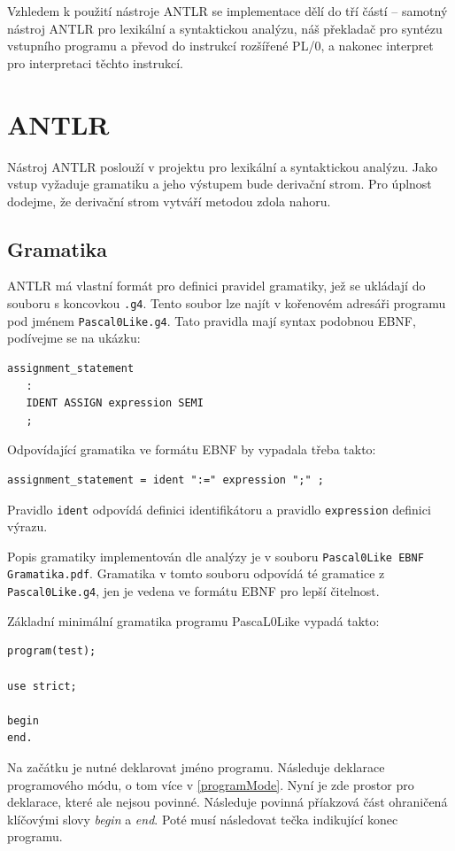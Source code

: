 \documentclass[
12pt,
a4paper,
pdftex,
czech,
titlepage
]{report}
\begin{document}
 Vzhledem k použití nástroje ANTLR se implementace dělí do tří částí -- samotný nástroj ANTLR pro lexikální a syntaktickou analýzu, náš překladač pro syntézu vstupního programu a převod do instrukcí rozšířené PL/0, a nakonec interpret pro interpretaci těchto instrukcí.
 
 \section{ANTLR}
 
 Nástroj ANTLR poslouží v projektu pro lexikální a syntaktickou analýzu. Jako vstup vyžaduje gramatiku a jeho výstupem bude derivační strom. Pro úplnost dodejme, že derivační strom vytváří metodou zdola nahoru.

 
 \subsection{Gramatika} \label{gramatika}
	ANTLR má vlastní formát pro definici pravidel gramatiky, jež se ukládají do souboru s koncovkou \texttt{.g4}. Tento soubor lze najít v kořenovém adresáři programu pod jménem \texttt{Pascal0Like.g4}. Tato pravidla mají syntax podobnou EBNF, podívejme se na ukázku:
\begin{lstlisting}
assignment_statement
   :
   IDENT ASSIGN expression SEMI
   ;
\end{lstlisting}	
Odpovídající gramatika ve formátu EBNF by vypadala třeba takto:
\begin{lstlisting}
assignment_statement = ident ":=" expression ";" ;
\end{lstlisting}	

Pravidlo \texttt{ident} odpovídá definici identifikátoru a pravidlo \texttt{expression} definici výrazu.

Popis gramatiky implementován dle analýzy je v souboru \texttt{Pascal0Like EBNF Gramatika.pdf}. Gramatika v tomto souboru odpovídá té gramatice z \texttt{Pascal0Like.g4}, jen je vedena ve formátu EBNF pro lepší čitelnost.

Základní minimální gramatika programu PascaL0Like vypadá takto:
\begin{lstlisting}
program(test);

use strict;

begin
end.
\end{lstlisting}

Na začátku je nutné deklarovat jméno programu. Následuje deklarace programového módu, o tom více v \ref{programMode}. Nyní je zde prostor pro deklarace, které ale nejsou povinné. Následuje povinná příakzová část ohraničená klíčovými slovy \textit{begin} a \textit{end}. Poté musí následovat tečka indikující konec programu.
	
\end{document}
